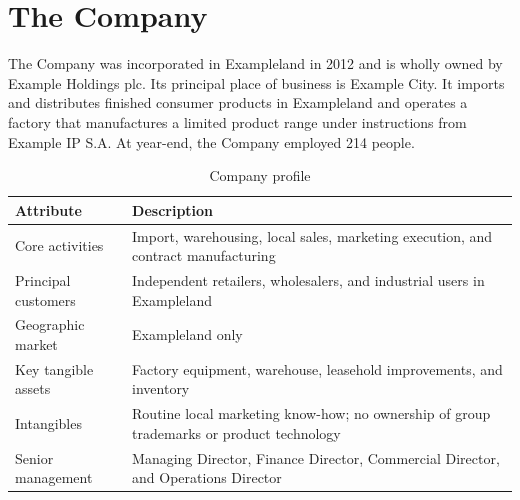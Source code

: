 \section{The Company}
The Company was incorporated in Exampleland in 2012 and is wholly owned by
Example Holdings plc. Its principal place of business is Example City. It
imports and distributes finished consumer products in Exampleland and operates
a factory that manufactures a limited product range under instructions from
Example IP S.A. At year-end, the Company employed 214 people.

\begin{table}[htbp]
  \centering
  \caption{Company profile}
  \begin{tabularx}{\textwidth}{@{}P{43mm}Y@{}}
    \toprule
    \textbf{Attribute} & \textbf{Description}\\
    \midrule
    Core activities & Import, warehousing, local sales, marketing execution, and contract manufacturing\\
    Principal customers & Independent retailers, wholesalers, and industrial users in Exampleland\\
    Geographic market & Exampleland only\\
    Key tangible assets & Factory equipment, warehouse, leasehold improvements, and inventory\\
    Intangibles & Routine local marketing know-how; no ownership of group trademarks or product technology\\
    Senior management & Managing Director, Finance Director, Commercial Director, and Operations Director\\
    \bottomrule
  \end{tabularx}
\end{table}
